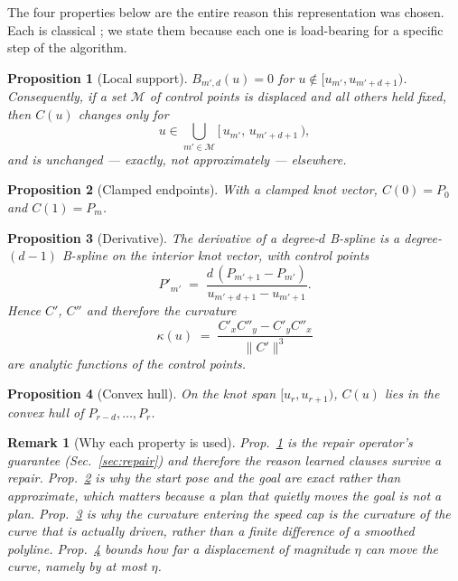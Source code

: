\documentclass[conference]{IEEEtran}
\newtheorem{proposition}{Proposition}
\newtheorem{remark}{Remark}
\begin{document}
The four properties below are the entire reason this representation was chosen. Each is
classical \cite{deboor1972}; we state them because each one is load-bearing for a specific
step of the algorithm.

\begin{proposition}[Local support]
\label{prop:support}
$B_{m',d}(u) = 0$ for $u \notin [u_{m'}, u_{m'+d+1})$. Consequently, if a set
$\mathcal{M}$ of control points is displaced and all others held fixed, then $C(u)$ changes
only for
\[
  u \in \bigcup_{m' \in \mathcal{M}} [\,u_{m'},\, u_{m'+d+1}\,),
\]
and is unchanged --- exactly, not approximately --- elsewhere.
\end{proposition}

\begin{proposition}[Clamped endpoints]
\label{prop:clamped}
With a clamped knot vector, $C(0) = P_0$ and $C(1) = P_m$.
\end{proposition}

\begin{proposition}[Derivative]
\label{prop:deriv}
The derivative of a degree-$d$ B-spline is a degree-$(d{-}1)$ B-spline on the interior knot
vector, with control points
\begin{equation}
  P'_{m'} \;=\; \frac{d\,(P_{m'+1}-P_{m'})}{u_{m'+d+1}-u_{m'+1}} .
  \label{eq:deriv}
\end{equation}
Hence $C'$, $C''$ and therefore the curvature
\begin{equation}
  \kappa(u) \;=\; \frac{C'_x C''_y - C'_y C''_x}{\lVert C'\rVert^3}
  \label{eq:kappa}
\end{equation}
are \emph{analytic} functions of the control points.
\end{proposition}

\begin{proposition}[Convex hull]
\label{prop:hull}
On the knot span $[u_r, u_{r+1})$, $C(u)$ lies in the convex hull of
$P_{r-d},\dots,P_{r}$.
\end{proposition}

\begin{remark}[Why each property is used]
Prop.~\ref{prop:support} is the repair operator's guarantee (Sec.~\ref{sec:repair}) and
therefore the reason learned clauses survive a repair. Prop.~\ref{prop:clamped} is why the
start pose and the goal are exact rather than approximate, which matters because a plan
that quietly moves the goal is not a plan. Prop.~\ref{prop:deriv} is why the curvature
entering the speed cap is the curvature of the curve that is actually driven, rather than a
finite difference of a smoothed polyline. Prop.~\ref{prop:hull} bounds how far a
displacement of magnitude $\eta$ can move the curve, namely by at most $\eta$.
\end{remark}
\end{document}
